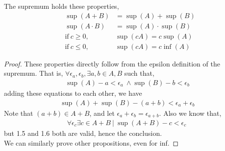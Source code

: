 \begin{proposition}
    The supremum holds these properties,
    \begin{align}
        &\sup(A+B) &= \sup(A) + \sup(B) \\
        &\sup(A \cdot B) &= \sup(A) \cdot \sup(B) \\
        &\text{if} \ c \ge 0, &\sup(cA) = c\sup(A)\\
        &\text{if} \ c \le 0, &\sup(cA) = c\inf(A)
    \end{align}
    \begin{proof}
        These properties directly follow from the epsilon definition of the supremum. That is, $\forall \epsilon_a, \epsilon_b, \exists a,b \in A,B$ such that,
        \begin{align*}
            \sup(A) -a < \epsilon_a \ \land \sup(B) -b < \epsilon_b
        \end{align*}
        adding these equations to each other, we have
        \begin{align} \sup(A) + \sup(B) - (a+b) < \epsilon_a + \epsilon_b \end{align}
        Note that $(a+b) \in A+B$, and let $\epsilon_a + \epsilon_b = \epsilon_{a+b}$. Also we know that,
        \begin{align}\forall \epsilon_c \exists c \in A+B \ | \ \sup(A+B) - c < \epsilon_c \ \end{align}
        but 1.5 and 1.6 both are valid, hence the conclusion. \\
        We can similarly prove other propositions, even for inf.
    \end{proof}

\end{proposition}
